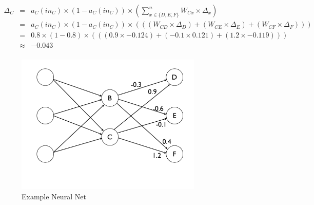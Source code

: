 \documentclass[solution]{ditpaper}
\begin{document}
\begin{enumerate}
\begin{enumerate}
\begin{answer}
\begin{eqnarray*}
\Delta_C &=& a_C(in_C) \times (1-a_C(in_C)) \times \left( \sum_{x \in \{D,E,F\}}^{n}W_{Cx} \times \Delta_x \right)\\
&=& a_C(in_C) \times (1-a_C(in_C)) \times \left(((W_{CD} \times \Delta_D)+(W_{CE} \times \Delta_E)+(W_{CF} \times \Delta_F))\right)\\
&=& 0.8 \times (1-0.8) \times \left(((0.9 \times -0.124)+(-0.1 \times 0.121)+(1.2 \times -0.119))\right)\\
&\approx& -0.043\\
\end{eqnarray*}

		\end{answer}
\end{enumerate}

\end{enumerate}

\clearpage
\newpage

\begin{figure}[htbp]
\begin{center}
\includegraphics[width=3.5in]{./images/backpropnetwork1.png}
\caption{Example Neural Net}
\label{fig:nn}
\end{center}
\end{figure}
\end{document}
